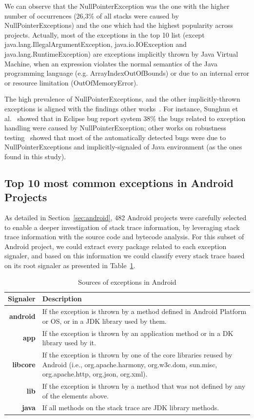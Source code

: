 \documentclass[conference]{IEEEtran}
\begin{document}
We can observe that the NullPointerException was the one with the higher number
of occurrences (26,3\% of all stacks were caused by NullPointerExceptions) and
the one which had the highest popularity across projects. Actually, most of the
exceptions in the top 10 list (except java.lang.IllegalArgumentException,
java.io.IOException and java.lang.RuntimeException) are exceptions implicitly
thrown by Java Virtual Machine, when an expression violates the normal
semantics of the Java programming language (e.g. ArrayIndexOutOfBounds) or due
to an internal error or resource limitation (OutOfMemoryError).

The high prevalence of NullPointerExceptions, and the other implicitly-thrown
exceptions  is aligned with the findings other works~\cite{kim2013predicting,fraser20131600,csallner2004jcrasher}. For instance, Sunghun et
al.~\cite{kim2013predicting} showed that in Eclipse bug report system 38\% the bugs related to exception handling were caused by NullPointerException; other works on robustness testing~\cite{maji2012empirical,csallner2004jcrasher}
showed that most of the automatically
detected bugs were due to NullPointerExceptions and implicitly-signaled of Java
environment (as the ones found in this study).

\subsection{Top 10 most common exceptions in Android Projects}

As detailed in Section~\ref{sec:android}, 482 Android projects were carefully
selected to enable a deeper investigation of stack trace information, by
leveraging stack trace information with the source code and bytecode analysis.
For this subset of Android project, we could extract every package related to
each exception signaler, and based on this information we could classify every
stack trace based on its root signaler as presented in Table~\ref{tab:signalers}.

\begin{table}
  \centering
  \begin{tabular}{rp{29em}}
    \hline
    \bfseries{Signaler} & \bfseries{Description} \\
    \hline
    \bfseries{android} & If the exception is thrown by a method defined in Android Platform or OS, or in a JDK library used by them.\\
    \bfseries{app}     & If the exception is thrown by an application method or in a  DK library used by it.\\
    \bfseries{libcore} & If the exception is thrown by one of the core libraries reused by Android (i.e., org.apache.harmony, org.w3c.dom, sun.misc, org.apache.http, org.json, org.xml). \\
    \bfseries{lib}     & If the exception is thrown by a method that was not defined by any of the elements above.\\
    \bfseries{java}    & If all methods on the stack trace are JDK library methods.\\
    \hline
  \end{tabular}
  \caption{Sources of exceptions in Android}
  \label{tab:signalers}
\end{table}
\end{document}
